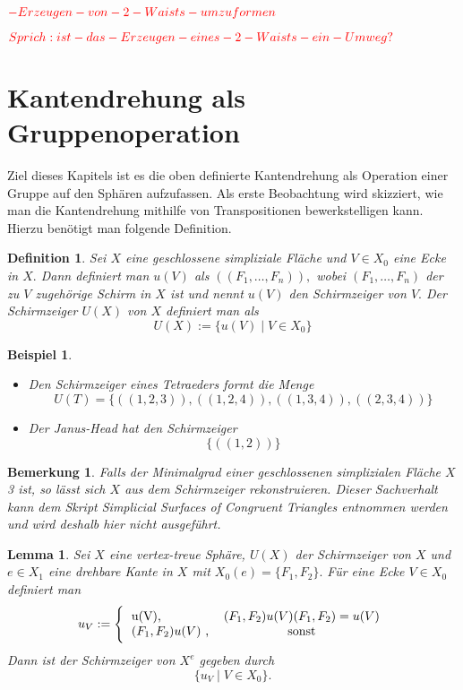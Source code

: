 \documentclass[12pt,titlepage,twoside,cleardoublepage]{article}
\theoremstyle{nummermitklammern}
\newtheorem{lemma}[temp]{Lemma}
\newtheorem{bsp}[temp]{Beispiel}
\newtheorem{definition}[temp]{Definition}
\newtheorem{bemerkung}[temp]{Bemerkung}
\newtheorem{definition}[zahl]{Definition}
\newtheorem{lemma}[zahl]{Lemma}
\newtheorem{bsp}[zahl]{Beispiel}
\newtheorem{bemerkung}[zahl]{Bemerkung}
\numberwithin{equation}{section}
\begin{document}
$\textcolor{red}{-Erzeugen-von-2-Waists-umzuformen}$

$\textcolor{red}{Sprich:ist-das-Erzeugen-eines-2-Waists-ein-Umweg?}$
\section{Kantendrehung als Gruppenoperation}
Ziel dieses Kapitels ist es die oben definierte Kantendrehung als Operation einer Gruppe auf den Sphären aufzufassen. Als erste Beobachtung wird skizziert, wie man die Kantendrehung mithilfe von Transpositionen bewerkstelligen kann. Hierzu benötigt man folgende Definition. 
\begin{definition}
Sei $X$ eine geschlossene simpliziale Fläche und $V\in X_0$ eine Ecke in $X.$ Dann definiert man $u(V)$ als $((F_1, \ldots , F_n)),$ wobei $(F_1,\ldots,F_n)$ der zu $V$ zugehörige Schirm in $X$ ist und nennt $u(V)$ den \emph{Schirmzeiger} von $V.$ Der \emph{Schirmzeiger} $U(X)$ von $X$ definiert man als 
\[
U(X):=\{u(V) \mid V\in X_0\}
\]
\end{definition}
\begin{bsp}
\begin{itemize}
\item 
Den Schirmzeiger eines Tetraeders formt die Menge 
\[
U(T)=\{ ((1,2,3)),((1,2,4)),((1,3,4)),((2,3,4))\}
\]
\item Der Janus-Head hat den Schirmzeiger 
\[
\{((1,2))\}
\]
\end{itemize}
\end{bsp}
\begin{bemerkung}
Falls der Minimalgrad einer geschlossenen simplizialen Fläche $X$ 3 ist, so lässt sich $X$ aus dem Schirmzeiger rekonstruieren. Dieser Sachverhalt kann dem Skript \emph{Simplicial Surfaces of Congruent Triangles} entnommen werden und wird deshalb hier nicht ausgeführt.
\end{bemerkung}
\begin{lemma}
Sei $X$ eine vertex-treue Sphäre, $U(X)$ der Schirmzeiger von $X$ und $e\in X_1$ eine drehbare Kante in $X$ mit $X_0(e)=\{F_1,F_2\}.$ Für eine Ecke $V\in X_0$ definiert man  
\[
u_V:=
\Biggl\{
\begin{tabular}[l]{lcr}
u(V),& $(F_1,F_2)u(V)(F_1,F_2)=u(V)$ \\
$(F_1,F_2) u(V)$ ,& sonst \\

\end{tabular}
\]
Dann ist der Schirmzeiger von $X^e$ gegeben durch 
\[
\{ u_V\mid V \in X_0\}.
\]
\end{lemma}
\end{document}
